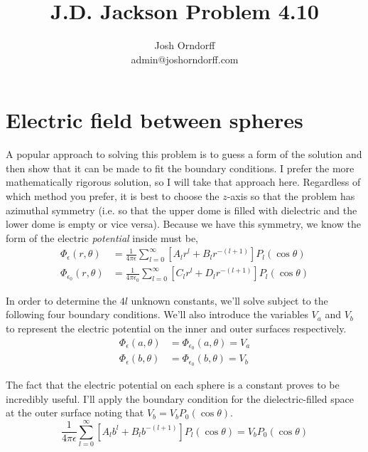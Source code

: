\documentclass[10pt,a4paper]{article}
\begin{document}
\title{J.D. Jackson Problem 4.10}
\author{Josh Orndorff \\ admin@joshorndorff.com}
\maketitle

\section{Electric field between spheres}
A popular approach to solving this problem is to guess a form of the solution and then show that it can be made to fit the boundary conditions.  I prefer the more mathematically rigorous solution, so I will take that approach here.  Regardless of which method you prefer, it is best to choose the $z$-axis so that the problem has azimuthal symmetry (i.e. so that the upper dome is filled with dielectric and the lower dome is empty or vice versa).  Because we have this symmetry, we know the form of the electric \textit{potential} inside must be,
\begin{subequations}\begin{align}
\Phi_\epsilon(r, \theta)&=\frac{1}{4\pi\epsilon}\sum_{l=0}^\infty\left[A_lr^l+B_lr^{-(l+1)}\right]P_l(\cos\theta) \\
\Phi_{\epsilon_0}(r, \theta)&=\frac{1}{4\pi\epsilon_0}\sum_{l=0}^\infty\left[C_lr^l+D_lr^{-(l+1)}\right]P_l(\cos\theta)
\end{align}\end{subequations}

In order to determine the $4l$ unknown constants, we'll solve subject to the following four boundary conditions.  We'll also introduce the variables $V_a$ and $V_b$ to represent the electric potential on the inner and outer surfaces respectively.
\begin{subequations}\begin{align}
\Phi_\epsilon(a, \theta)&=\Phi_{\epsilon_0}(a, \theta)=V_a \\
\Phi_\epsilon(b, \theta)&=\Phi_{\epsilon_0}(b, \theta)=V_b
\end{align}\end{subequations}

The fact that the electric potential on each sphere is a constant proves to be incredibly useful.  I'll apply the boundary condition for the dielectric-filled space at the outer surface noting that $V_b=V_bP_0(\cos\theta)$.
\begin{equation}
\frac{1}{4\pi\epsilon}\sum_{l=0}^\infty\left[A_lb^l+B_lb^{-(l+1)}\right]P_l(\cos\theta) = V_bP_0(\cos\theta)
\end{equation}
\end{document}
